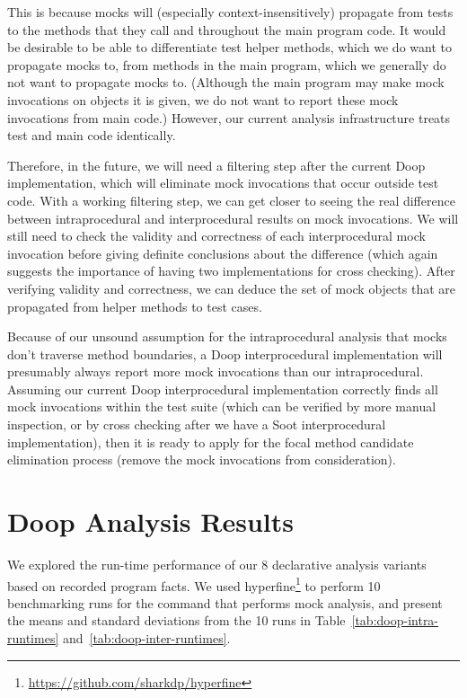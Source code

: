 This is because mocks will (especially context-insensitively) propagate from tests to the methods that they call and throughout the main program code. It would be desirable to be able to differentiate test helper methods, which we do want to propagate mocks to, from methods in the main program, which we generally do not want to propagate mocks to. (Although the main program may make mock invocations on objects it is given, we do not want to report these mock invocations from main code.) However, our current analysis infrastructure treats test and main code identically. 

Therefore, in the future, we will need a filtering step after the current Doop implementation, which will eliminate mock invocations that occur outside test code. With a working filtering step, we can get closer to seeing the real difference between intraprocedural and interprocedural results on mock invocations. We will still need to check the validity and correctness of each interprocedural mock invocation before giving definite conclusions about the difference (which again suggests the importance of having two implementations for cross checking). After verifying validity and correctness, we can deduce the set of mock objects that are propagated from helper methods to test cases.

Because of our unsound assumption for the intraprocedural analysis that mocks don't traverse method boundaries, a Doop interprocedural implementation will presumably always report more mock invocations than our intraprocedural. Assuming our current Doop interprocedural implementation correctly finds all mock invocations within the test suite (which can be verified by more manual inspection, or by cross checking after we have a Soot interprocedural implementation), then it is ready to apply for the focal method candidate elimination process (remove the mock invocations from consideration).

\section{Doop Analysis Results}

We explored the run-time performance of our 8 declarative analysis variants based on recorded program facts. We used hyperfine\footnote{\url{https://github.com/sharkdp/hyperfine}} to perform 10 benchmarking runs for the command that performs mock analysis, and present the means and standard deviations from the 10 runs in Table~\ref{tab:doop-intra-runtimes} and~\ref{tab:doop-inter-runtimes}.

